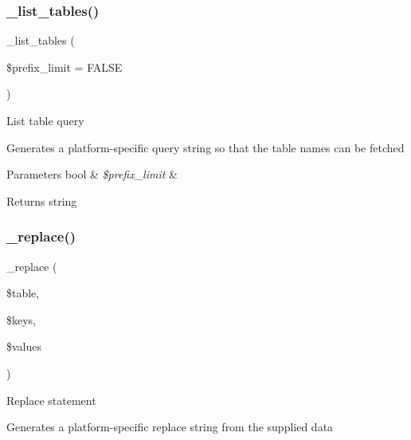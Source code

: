 \subsubsection{\texorpdfstring{\+\_\+list\+\_\+tables()}{\_list\_tables()}}
{\footnotesize\ttfamily \+\_\+list\+\_\+tables (\begin{DoxyParamCaption}\item[{}]{\$prefix\+\_\+limit = {\ttfamily FALSE} }\end{DoxyParamCaption})\hspace{0.3cm}{\ttfamily [protected]}}

List table query

Generates a platform-\/specific query string so that the table names can be fetched


\begin{DoxyParams}[1]{Parameters}
bool & {\em \$prefix\+\_\+limit} & \\
\hline
\end{DoxyParams}
\begin{DoxyReturn}{Returns}
string 
\end{DoxyReturn}
\mbox{\label{class_c_i___d_b__sqlite__driver_ae0adf73984daf2d42ad29b66c484c82b}} 
\subsubsection{\texorpdfstring{\+\_\+replace()}{\_replace()}}
{\footnotesize\ttfamily \+\_\+replace (\begin{DoxyParamCaption}\item[{}]{\$table,  }\item[{}]{\$keys,  }\item[{}]{\$values }\end{DoxyParamCaption})\hspace{0.3cm}{\ttfamily [protected]}}

Replace statement

Generates a platform-\/specific replace string from the supplied data


